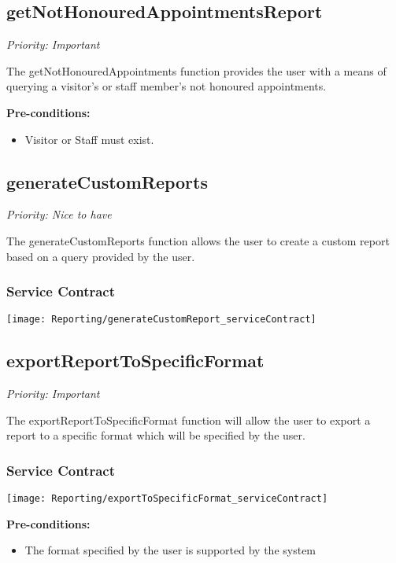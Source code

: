 \subsection{getNotHonouredAppointmentsReport}
\textit{Priority: Important}

	The getNotHonouredAppointments function provides the user with a means of querying a visitor's or staff member's not honoured appointments.

		
	\textbf{Pre-conditions:}
	\begin{itemize}
		\item Visitor or Staff must exist.
	\end{itemize}

\subsection{generateCustomReports}
\textit{Priority: Nice to have}

	The generateCustomReports function allows the user to create a custom report based on a query provided by the user.

\subsubsection{Service Contract}
\texttt{[image: Reporting/generateCustomReport\_serviceContract]}



\subsection{exportReportToSpecificFormat}
\textit{Priority: Important}

	The exportReportToSpecificFormat function will allow the user to export a report to a specific format which will be specified by the user.


\subsubsection{Service Contract}
\texttt{[image: Reporting/exportToSpecificFormat\_serviceContract]}

	\textbf{Pre-conditions:}
	\begin{itemize}
		\item The format specified by the user is supported by the system
	\end{itemize}
